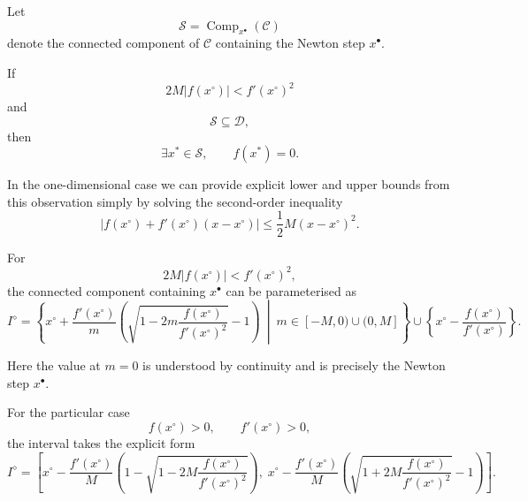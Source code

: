 \documentclass{article}
\theoremstyle{definition}
\begin{document}
Let
\begin{equation}
    \mathcal{S}
    =
    \operatorname{Comp}_{x^\bullet}(\mathcal{C})
\end{equation}
denote the connected component of $\mathcal{C}$ containing the Newton step
$x^\bullet$.

If
\begin{equation}
    2M|f(x^\circ)|
    <
    f'(x^\circ)^2
\end{equation}
and
\begin{equation}
    \mathcal{S}\subseteq\mathcal{D},
\end{equation}
then
\begin{equation}
    \exists x^*\in\mathcal{S},
    \qquad
    f(x^*)=0.
\end{equation}

In the one-dimensional case we can provide explicit lower and upper
bounds from this observation simply by solving the second-order
inequality
\begin{equation}
    \left|
        f(x^\circ)
        +
        f'(x^\circ)(x-x^\circ)
    \right|
    \leq
    \frac{1}{2}M(x-x^\circ)^2.
\end{equation}

For
\begin{equation}
    2M|f(x^\circ)|
    <
    f'(x^\circ)^2,
\end{equation}
the connected component containing $x^\bullet$ can be parameterised as
\begin{equation}
    I^\diamond
    =
    \left\{
        x^\circ
        +
        \frac{f'(x^\circ)}{m}
        \left(
            \sqrt{
                1
                -
                2m\frac{f(x^\circ)}{f'(x^\circ)^2}
            }
            -
            1
        \right)
        \ \middle|\
        m\in[-M,0)\cup(0,M]
    \right\}
    \cup
    \left\{
        x^\circ-\frac{f(x^\circ)}{f'(x^\circ)}
    \right\}.
\end{equation}

Here the value at $m=0$ is understood by continuity and is precisely
the Newton step $x^\bullet$.

For the particular case
\begin{equation}
    f(x^\circ)>0,
    \qquad
    f'(x^\circ)>0,
\end{equation}
the interval takes the explicit form
\begin{equation}
    I^\diamond
    =
    \left[
        x^\circ
        -
        \frac{f'(x^\circ)}{M}
        \left(
            1-
            \sqrt{
                1
                -
                2M\frac{f(x^\circ)}{f'(x^\circ)^2}
            }
        \right),
        \;
        x^\circ
        -
        \frac{f'(x^\circ)}{M}
        \left(
            \sqrt{
                1
                +
                2M\frac{f(x^\circ)}{f'(x^\circ)^2}
            }
            -
            1
        \right)
    \right].
\end{equation}
\end{document}
